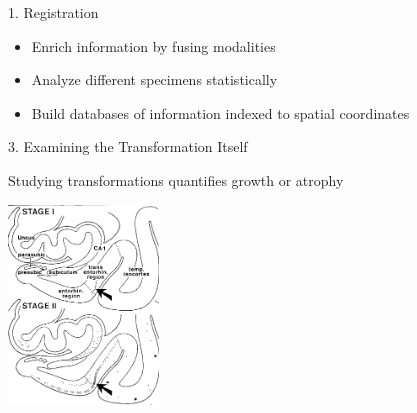 \documentclass{beamer}
\begin{document}
\begin{frame}{1. Registration}
\begin{itemize}
\item 
Enrich information by fusing modalities


\item
Analyze different specimens statistically

\item 
Build databases of information indexed to spatial coordinates

\end{itemize}

\end{frame}


\begin{frame}{3. Examining the Transformation Itself}

Studying transformations quantifies growth or atrophy %
\vspace{-0.5em}
\begin{center}
%
%
\includegraphics[width=0.3\textwidth]{braak12.png}

\end{center}
\end{frame}
\end{document}
